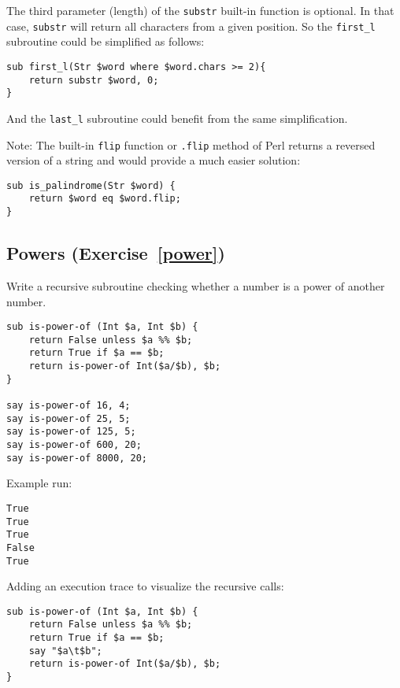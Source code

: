 The third parameter (length) of the {\tt substr} built-in 
function is optional. In that case, {\tt substr} will return 
all characters from a given position. So the \verb'first_l'  
subroutine could be simplified as follows:

\begin{verbatim}
sub first_l(Str $word where $word.chars >= 2){
    return substr $word, 0;
}
\end{verbatim} 

And the \verb'last_l' subroutine could benefit from the same 
simplification.

Note: The built-in {\tt flip} function or {\tt .flip} method 
of Perl returns a reversed version of a string and would 
provide a much easier solution:

\begin{verbatim}
sub is_palindrome(Str $word) {
    return $word eq $word.flip;
}
\end{verbatim}

\subsection{Powers (Exercise~\ref{power})}
\label{sol_power}

Write a recursive subroutine checking whether a number is 
a power of another number.

\begin{verbatim}
sub is-power-of (Int $a, Int $b) {
    return False unless $a %% $b;
    return True if $a == $b;
    return is-power-of Int($a/$b), $b;
}

say is-power-of 16, 4;
say is-power-of 25, 5;
say is-power-of 125, 5;
say is-power-of 600, 20;
say is-power-of 8000, 20;
\end{verbatim}
%

Example run:
\begin{verbatim}
True
True
True
False
True
\end{verbatim}

Adding an execution trace to visualize the recursive calls:

\begin{verbatim}
sub is-power-of (Int $a, Int $b) {     
    return False unless $a %% $b;      
    return True if $a == $b;           
    say "$a\t$b";                      
    return is-power-of Int($a/$b), $b; 
}                                      
\end{verbatim}

